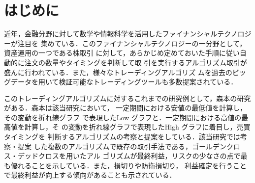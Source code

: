 \chapter{はじめに}
\label{chapter:Introduction}

\setcounter{page}{1}




近年，金融分野に対して数学や情報科学を活用したファイナンシャルテクノロジーが注目を
集めている．このファイナンシャルテクノロジーの一分野として，資産運用の一つである株取引
に対して，あらかじめ定めておいた手順に従い自動的に注文の数量やタイミングを判断して取
引を実行するアルゴリズム取引が盛んに行われている．また，様々なトレーディングアルゴリズ
ムを過去のビッグデータを用いて検証可能なトレーディングツールも多数提案されている．

このトレーディングアルゴリズムに対するこれまでの研究例として，森本の研究\cite{morimoto}がある．森本は該当研究において，
一定期間における安値の最低値を計算し，その変動を折れ線グラフ
で表現したLow グラフと．一定期間における高値の最高値を計算し，そ
の変動を折れ線グラフで表現したHigh グラフに着目し，売買タイミングを
判断するアルゴリズムの考察と提案をしている．該当研究では考察・提案
した複数のアルゴリズムで既存の取引手法である，ゴールデンクロス・デッドクロスを用いたアル
ゴリズムが最終利益，リスクの少なさの点で最も優れることを示している．また，損切りや防衛損切り，
利益確定を行うことで最終利益が向上する傾向があることも示されている．




